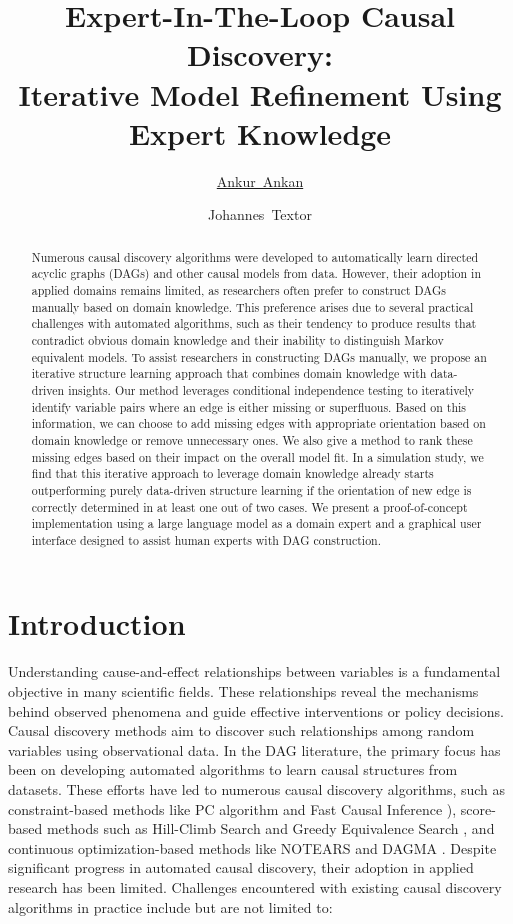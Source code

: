 \documentclass{uai2025} %
\title{Expert-In-The-Loop Causal Discovery: \\ Iterative Model Refinement Using Expert Knowledge}
\author[1]{\href{mailto:<ankur.ankan@ru.nl>?Subject=Your UAI 2025 paper}{Ankur~Ankan}{}}
\author[1]{Johannes~Textor}
\affil[1]{%
    Institute for Computing and Information Sciences\\
    Radboud University\\
    Nijmegen, The Netherlands
}
\begin{document}
\maketitle

\begin{abstract}
	Numerous causal discovery algorithms were developed to automatically learn
	directed acyclic graphs (DAGs) and other causal models from data. However,
	their adoption in applied domains remains limited, as researchers often
	prefer to construct DAGs manually based on domain knowledge. This
	preference arises due to several practical challenges with automated
	algorithms, such as their tendency to produce results that contradict
	obvious domain knowledge and their inability to distinguish Markov equivalent
	models. To assist researchers in constructing DAGs manually, we propose an iterative
	structure learning approach that combines domain knowledge with
	data-driven insights. Our method leverages conditional independence
	testing to iteratively identify variable pairs where an edge is
	either missing or superfluous. Based on this information, we can choose
	to add missing edges with appropriate orientation based on domain
	knowledge or remove unnecessary ones. We also give a method to rank
	these missing edges based on their impact on the overall model fit.
	In a simulation study, we find that this iterative approach to leverage domain 
	knowledge already starts outperforming purely data-driven structure learning if 
	the orientation of new edge is correctly determined in at least one out of two cases.
	We present a proof-of-concept implementation using a large language 
	model as a domain expert and a graphical user interface designed to 
	assist human experts with DAG construction.
\end{abstract}

\section{Introduction}
Understanding cause-and-effect relationships between variables is a fundamental
objective in many scientific fields. These relationships reveal the mechanisms
behind observed phenomena and guide effective interventions or policy
decisions. Causal discovery methods aim to discover such relationships among
random variables using observational data. In the DAG literature, the primary
focus has been on developing automated algorithms to learn causal structures
from datasets. These efforts have led to numerous causal discovery algorithms,
such as constraint-based methods like PC algorithm \citep{Spirtes2001,KalischB07} 
and Fast Causal Inference \citep{Spirtes2000}), score-based methods such as Hill-Climb
Search and Greedy Equivalence Search \citep{Chickering2002}, and continuous
optimization-based methods like NOTEARS \citep{Zheng2018} and DAGMA
\citep{Bello2022}. Despite significant progress in automated causal discovery,
their adoption in applied research has been limited. Challenges encountered with existing
causal discovery algorithms in practice include but are not limited to:
\end{document}
